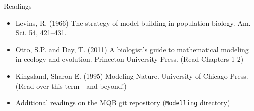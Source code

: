 \documentclass[xcolor=x11names,compress]{beamer}
\renewcommand{\(}{\begin{columns}}
\renewcommand{\)}{\end{columns}}
\newcommand{\<}[1]{\begin{column}{#1}}
\renewcommand{\>}{\end{column}}
\begin{document}

\begin{frame}{Readings}

\begin{itemize}\itemsep10pt

\item Levins, R. (1966) The strategy of model building in population biology. Am. Sci. 54, 421--431.  

\item Otto, S.P. and Day, T. (2011) A biologist's guide to mathematical modeling in ecology and evolution. Princeton University Press. (Read Chapters 1-2) 

\item Kingsland, Sharon E. (1995) Modeling Nature. University of Chicago Press. (Read over this term - and beyond!)


\item Additional readings on the MQB git repository ({\tt Modelling} directory)
 
\end{itemize}
\end{frame}
\end{document}
